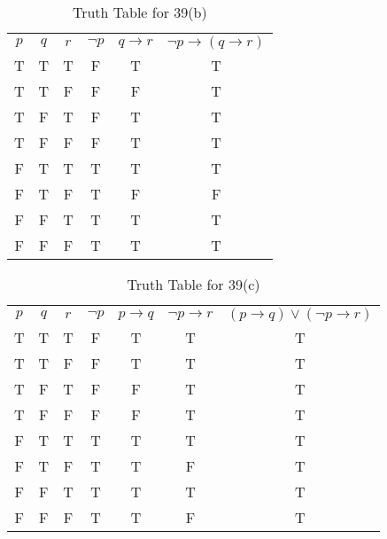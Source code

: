 \documentclass{Axon}
\begin{document}
\begin{table}[ht]
    \centering
    \begin{tabular}{c|c|c|c|c|c}
    \(p\) & \(q\) & \(r\) & \(\lnot p\) & \(q \to r\) & \(\lnot p \to (q \to r)\) \\
    T     & T     & T     & F           & T           & T                         \\
    T     & T     & F     & F           & F           & T                         \\
    T     & F     & T     & F           & T           & T                         \\
    T     & F     & F     & F           & T           & T                         \\
    F     & T     & T     & T           & T           & T                         \\
    F     & T     & F     & T           & F           & F                         \\
    F     & F     & T     & T           & T           & T                         \\
    F     & F     & F     & T           & T           & T
    \end{tabular}
    \caption{Truth Table for 39(b)}
\end{table}

\begin{table}[ht]
    \centering
    \begin{tabular}{c|c|c|c|c|c|c}
    \(p\) & \(q\) & \(r\) & \(\lnot p\) & \(p \to q\) & \(\lnot p \to r\) & \((p \to q) \lor (\lnot p \to r)\) \\
    T     & T     & T     & F           & T           & T                 & T                                  \\
    T     & T     & F     & F           & T           & T                 & T                                  \\
    T     & F     & T     & F           & F           & T                 & T                                  \\
    T     & F     & F     & F           & F           & T                 & T                                  \\
    F     & T     & T     & T           & T           & T                 & T                                  \\
    F     & T     & F     & T           & T           & F                 & T                                  \\
    F     & F     & T     & T           & T           & T                 & T                                  \\
    F     & F     & F     & T           & T           & F                 & T                                  
    \end{tabular}
    \caption{Truth Table for 39(c)}
\end{table}
\end{document}
